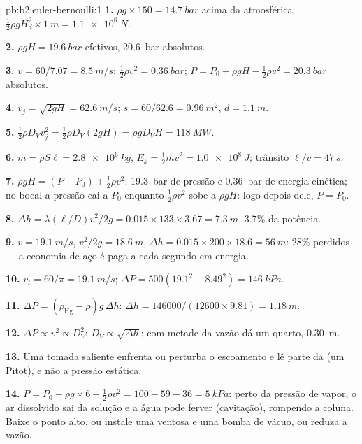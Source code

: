 \begin{solution}{pb:b2:euler-bernoulli:1}
\textbf{1.} $\rho g \times 150 = \qty{14.7}{bar}$ acima da atmosférica; $\tfrac12\rho gH_d^2
\times \qty{1}{m} = \qty{1.1e8}{N}$.

\textbf{2.} $\rho gH = \qty{19.6}{bar}$ efetivos, \qty{20.6}{bar} absolutos.

\textbf{3.} $v = 60/7.07 = \qty{8.5}{m/s}$; $\tfrac12\rho v^2 = \qty{0.36}{bar}$; $P =
P_0 + \rho gH - \tfrac12\rho v^2 = \qty{20.3}{bar}$ absolutos.

\textbf{4.} $v_j = \sqrt{2gH} = \qty{62.6}{m/s}$; $s = 60/62.6 = \qty{0.96}{m^2}$, $d =
\qty{1.1}{m}$.

\textbf{5.} $\tfrac12\rho D_Vv_j^2 = \tfrac12\rho D_V(2gH) = \rho gD_VH = \qty{118}{MW}$.

\textbf{6.} $m = \rho S\ell = \qty{2.8e6}{kg}$, $E_k = \tfrac12mv^2 = \qty{1.0e8}{J}$;
trânsito $\ell/v = \qty{47}{s}$.

\textbf{7.} $\rho gH = (P - P_0) + \tfrac12\rho v^2$: \qty{19.3}{bar} de pressão
e \qty{0.36}{bar} de energia cinética; no bocal a pressão cai
a $P_0$ enquanto $\tfrac12\rho v^2$ sobe a $\rho gH$: logo depois dele, $P = P_0$.

\textbf{8.} $\Delta h = \lambda(\ell/D)v^2/2g = 0.015 \times 133 \times 3.67 = \qty{7.3}{m}$,
$3.7\%$ da potência.

\textbf{9.} $v = \qty{19.1}{m/s}$, $v^2/2g = \qty{18.6}{m}$, $\Delta h = 0.015 \times 200 \times
18.6 = \qty{56}{m}$: $28\%$ perdidos --- a economia de aço é paga a cada
segundo em energia.

\textbf{10.} $v_t = 60/\pi = \qty{19.1}{m/s}$; $\Delta P = 500(19.1^2 - 8.49^2) =
\qty{146}{kPa}$.

\textbf{11.} $\Delta P = (\rho_{\text{Hg}} - \rho)g\,\Delta h$: $\Delta h = 146000/(12600
\times 9.81) = \qty{1.18}{m}$.

\textbf{12.} $\Delta P \propto v^2 \propto D_V^2$: $D_V \propto \sqrt{\Delta h}$; com metade da
vazão dá um quarto, \qty{0.30}{m}.

\textbf{13.} Uma tomada saliente enfrenta ou perturba o escoamento e lê parte
da  (um Pitot), e não a pressão estática.

\textbf{14.} $P = P_0 - \rho g \times 6 - \tfrac12\rho v^2 = 100 - 59 - 36 = \qty{5}{kPa}$:
perto da pressão de vapor, o ar dissolvido sai da solução e a água pode
ferver (cavitação), rompendo a coluna. Baixe o ponto alto, ou instale uma
ventosa e uma bomba de vácuo, ou reduza a vazão.


\end{solution}
